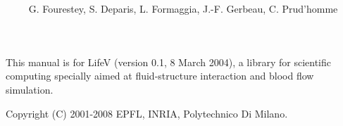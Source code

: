 \documentclass[a4paper,report]{lifestyle}
\title{\lifetitle{LifeV Developer Manual}
}
\author{G. Fourestey, S. Deparis, L. Formaggia, J.-F. Gerbeau, C. Prud'homme }
\date{}
\begin{document}
\maketitle


\phantom{dummy text}
\vfill
This manual is for LifeV (version 0.1, 8 March 2004), a library for scientific computing specially aimed at fluid-structure interaction and blood flow simulation.

Copyright (C) 2001-2008 EPFL, INRIA, Polytechnico Di Milano.

\tableofcontents

\listoffigures

\listoftables

%
%







\printindex
\end{document}
